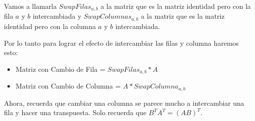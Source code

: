 \documentclass[12pt, fleqn]{report}                             %
\theoremstyle{break}                                            %
\begin{document}
                    Vamos a llamarla $SwapFilas_{a, b}$ a la matriz que es la matriz identidad pero
                    con la fila $a$ y $b$ intercambiada y $SwapColumnas_{a, b}$ a la matriz que es
                    la matriz identidad pero con la columna $a$ y $b$ intercambiada.

                    Por lo tanto para lograr el efecto de intercambiar las filas y columna haremos esto:
                    \begin{itemize}
                        \item Matriz con Cambio de Fila = $SwapFilas_{a, b} * A$
                        \item Matriz con Cambio de Columna = $A * SwapColumna_{a, b}$
                    \end{itemize}

                    Ahora, recuerda que cambiar una columna se parece mucho a intercambiar una fila y hacer
                    una transpuesta. Solo recuerda que $B^T A^T = (AB)^T$.
\end{document}
